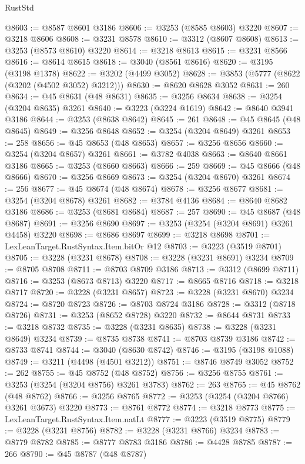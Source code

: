 \begin{lexlean}{RustStd}
\begin{coremodule}
@8603 := @8587 @8601 @3186
@8606 := @3253 (@8585 @8603) @3220
@8607 := @3218 @8606
@8608 := @3231 @8578
@8610 := @3312 (@8607 @8608)
@8613 := @3253 (@8573 @8610) @3220
@8614 := @3218 @8613
@8615 := @3231 @8566
@8616 := @8614 @8615
@8618 := @3040 (@8561 @8616)
@8620 := @3195 (@3198 @1378)
@8622 := @3202 (@4499 @3052)
@8628 := @3853 (@5777 (@8622 (@3202 (@4502 @3052) @3212)))
@8630 := @8620 @8628 @3052
@8631 := 260
@8634 := @45 @8631 (@48 @8631)
@8635 := @3256 @8634
@8638 := @3254 (@3204 @8635) @3261
@8640 := @3223 (@3224 @1619)
@8642 := @8640 @3941 @3186
@8644 := @3253 (@8638 @8642)
@8645 := 261
@8648 := @45 @8645 (@48 @8645)
@8649 := @3256 @8648
@8652 := @3254 (@3204 @8649) @3261
@8653 := 258
@8656 := @45 @8653 (@48 @8653)
@8657 := @3256 @8656
@8660 := @3254 (@3204 @8657) @3261
@8661 := @3782 @4038
@8663 := @8640 @8661 @3186
@8665 := @3253 (@8660 @8663)
@8666 := 259
@8669 := @45 @8666 (@48 @8666)
@8670 := @3256 @8669
@8673 := @3254 (@3204 @8670) @3261
@8674 := 256
@8677 := @45 @8674 (@48 @8674)
@8678 := @3256 @8677
@8681 := @3254 (@3204 @8678) @3261
@8682 := @3784 @4136
@8684 := @8640 @8682 @3186
@8686 := @3253 (@8681 @8684)
@8687 := 257
@8690 := @45 @8687 (@48 @8687)
@8691 := @3256 @8690
@8697 := @3253 (@3254 (@3204 @8691) @3261 @4458) @3220
@8698 := @8686 @8697
@8699 := @3218 @8698
@8701 := LexLeanTarget.RustSyntax.Item.bitOr @12
@8703 := @3223 (@3519 @8701)
@8705 := @3228 (@3231 @8678)
@8708 := @3228 (@3231 @8691) @3234
@8709 := @8705 @8708
@8711 := @8703 @8709 @3186
@8713 := @3312 (@8699 @8711)
@8716 := @3253 (@8673 @8713) @3220
@8717 := @8665 @8716
@8718 := @3218 @8717
@8720 := @3228 (@3231 @8657)
@8723 := @3228 (@3231 @8670) @3234
@8724 := @8720 @8723
@8726 := @8703 @8724 @3186
@8728 := @3312 (@8718 @8726)
@8731 := @3253 (@8652 @8728) @3220
@8732 := @8644 @8731
@8733 := @3218 @8732
@8735 := @3228 (@3231 @8635)
@8738 := @3228 (@3231 @8649) @3234
@8739 := @8735 @8738
@8741 := @8703 @8739 @3186
@8742 := @8733 @8741
@8744 := @3040 (@8630 @8742)
@8746 := @3195 (@3198 @1088)
@8749 := @3211 (@4498 (@4501 @3212))
@8751 := @8746 @8749 @3052
@8752 := 262
@8755 := @45 @8752 (@48 @8752)
@8756 := @3256 @8755
@8761 := @3253 (@3254 (@3204 @8756) @3261 @3783)
@8762 := 263
@8765 := @45 @8762 (@48 @8762)
@8766 := @3256 @8765
@8772 := @3253 (@3254 (@3204 @8766) @3261 @3673) @3220
@8773 := @8761 @8772
@8774 := @3218 @8773
@8775 := LexLeanTarget.RustSyntax.Item.natLt
@8777 := @3223 (@3519 @8775)
@8779 := @3228 (@3231 @8756)
@8782 := @3228 (@3231 @8766) @3234
@8783 := @8779 @8782
@8785 := @8777 @8783 @3186
@8786 := @4428 @8785
@8787 := 266
@8790 := @45 @8787 (@48 @8787)

\end{coremodule}
\end{lexlean}
